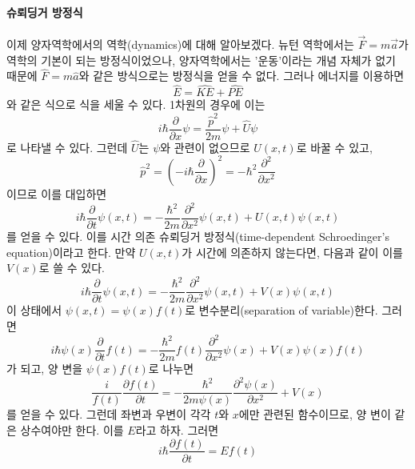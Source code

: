 \paragraph{슈뢰딩거 방정식}
이제 양자역학에서의 역학(dynamics)에 대해 알아보겠다. 뉴턴 역학에서는 $\vec{F}=m\vec{a}$가 역학의 기본이 되는 방정식이었으나, 양자역학에서는 '운동'이라는 개념 자체가 없기 때문에 $\hat{F}=m\hat{a}$와 같은 방식으로는 방정식을 얻을 수 없다. 그러나 에너지를 이용하면 
\begin{equation}
\hat{E}=\hat{KE}+\hat{PE}
\end{equation}
와 같은 식으로 식을 세울 수 있다.
1차원의 경우에 이는  
\begin{equation}
i\hbar\frac{\partial}{\partial x}\psi=\frac{\hat{p}^2}{2m}\psi+\hat{U}\psi
\end{equation}
로 나타낼 수 있다. 그런데 $\hat{U}$는 $\psi$와 관련이 없으므로 $U(x,t)$로 바꿀 수 있고, 
\begin{equation}
\hat{p}^2=(-i\hbar\frac{\partial}{\partial x})^2=-\hbar^2\frac{\partial^2}{\partial x^2}
\end{equation}
이므로 이를 대입하면
\begin{equation}
i\hbar \frac{\partial}{\partial t}\psi(x,t) =-\frac{\hbar^2}{2m}\frac{\partial^2}{\partial x^2}\psi(x,t)+U(x,t)\psi(x,t)
\end{equation}
를 얻을 수 있다. 이를 시간 의존 슈뢰딩거 방정식(time-dependent Schroedinger's equation)이라고 한다. 만약 $U(x,t)$가 시간에 의존하지 않는다면, 다음과 같이 이를 $V(x)$로 쓸 수 있다. 
\begin{equation}
i\hbar \frac{\partial}{\partial t}\psi(x,t) =-\frac{\hbar^2}{2m}\frac{\partial^2}{\partial x^2}\psi(x,t)+V(x)\psi(x,t)
\end{equation}
이 상태에서 $\psi(x,t)=\psi(x)f(t)$로 변수분리(separation of variable)한다. 그러면
\begin{equation}
i\hbar \psi(x) \frac{\partial}{\partial t}f(t) =-\frac{\hbar^2}{2m}f(t)\frac{\partial^2}{\partial x^2}\psi(x)+V(x)\psi(x)f(t)
\end{equation}
가 되고, 양 변을 $\psi(x)f(t)$로 나누면
\begin{equation}
\frac{i}{f(t)} \frac{\partial f(t)}{\partial t} =-\frac{\hbar^2}{2m\psi(x)}\frac{\partial^2 \psi(x)}{\partial x^2}+V(x)
\end{equation}
를 얻을 수 있다. 그런데 좌변과 우변이 각각 $t$와 $x$에만 관련된 함수이므로, 양 변이 같은 상수여야만 한다. 이를 $E$라고 하자. 그러면
\begin{equation}
i\hbar \frac{\partial f(t)}{\partial t}=Ef(t)
\end{equation}
